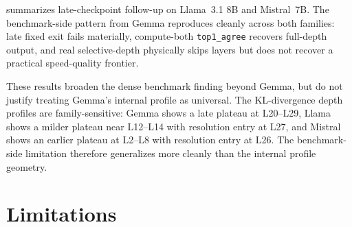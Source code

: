 \documentclass[11pt]{article}
\begin{document}
 summarizes late-checkpoint follow-up on Llama~3.1 8B and Mistral~7B. The benchmark-side pattern from Gemma reproduces cleanly across both families: late fixed exit fails materially, compute-both \texttt{top1\_agree} recovers full-depth output, and real selective-depth physically skips layers but does not recover a practical speed-quality frontier.

These results broaden the dense benchmark finding beyond Gemma, but do not justify treating Gemma's internal profile as universal. The KL-divergence depth profiles are family-sensitive: Gemma shows a late plateau at L20--L29, Llama shows a milder plateau near L12--L14 with resolution entry at L27, and Mistral shows an earlier plateau at L2--L8 with resolution entry at L26. The benchmark-side limitation therefore generalizes more cleanly than the internal profile geometry.

\section{Limitations}
\end{document}
